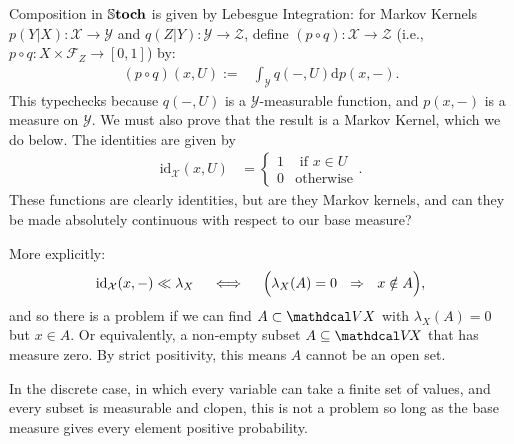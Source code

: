 \begin{defn}
    Composition in $\mathbb{S}\mathbf{toch}$ is given by Lebesgue Integration: for Markov Kernels $p(Y|X) : \mathcal X \to \mathcal Y$ and $q(Z|Y) : \mathcal Y \to \mathcal Z$, define
    $(p \circ q) : \mathcal X \to \mathcal Z$  (i.e., $p \circ q : X \times \mathcal F_Z \to [0,1]$) by:
    \begin{align*}
        (p\circ q)(x, U) :=& \int_{\mathcal Y}
            q(-, U)
            \mathrm d p(x,-).
    \end{align*}
    This typechecks because $q(-,U)$ is a $\mathcal Y$-measurable function, and $p(x,-)$ is a measure on $\mathcal Y$. 
    We must also prove that the result is a Markov Kernel, which we do below. 
    The identities are given by
    \begin{align*}
    \mathrm{id}_{\mathcal X}(x, U) &= \begin{cases}
            1 & \text{ if }x \in U \\ 0 & \text{otherwise}
        \end{cases}.
    \end{align*}
    These functions are clearly identities, but are they Markov kernels,
    and can they be made absolutely continuous with respect to our
    base measure?
    
    {\color{red}
    More explicitly:
    \[
        \mathrm{id}_{\cal X}(x,-) \ll \lambda_X
        \quad\iff\quad
        \Big( \lambda_X(A)=0 ~~\Rightarrow~~ x \notin A\Big),
    \]
    and so there is a problem if we can find $A \subset \V X$ with
    $\lambda_X(A) = 0$ but $x \in A$. Or equivalently, a non-empty
    subset $A \subseteq \V\! X$ that has measure zero. By strict positivity,
    this means $A$ cannot be an open set. 
    
    In the discrete case, in which every variable can take a finite set of values,
    and every subset is measurable and clopen, this is not a problem so long
    as the base measure gives every element positive probability.
    
    }
\end{defn}












